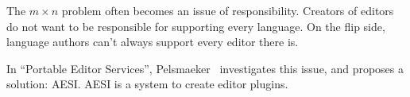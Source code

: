 The $m \times n$ problem often becomes an issue of responsibility.
Creators of editors do not want to be responsible for supporting every language.
On the flip side, language authors can't always support every editor there is.

In ``Portable Editor Services'', Pelsmaeker~\autocite*{Pelsmaeker2018} investigates this issue, and proposes a solution: \ac{AESI}.
\ac{AESI} is a system to create editor plugins.


